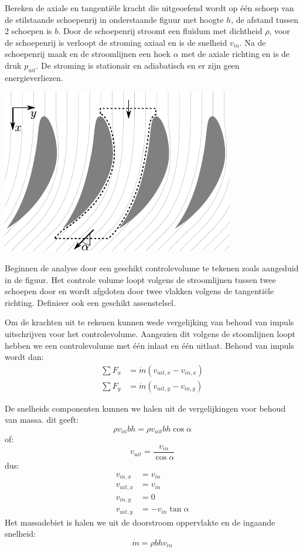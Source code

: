 \begin{voorbeeld}
	Bereken de axiale en tangentiële kracht die uitgeoefend wordt op één schoep van de stilstaande schoepenrij in onderstaande figuur met hoogte $h$, de afstand tussen 2 schoepen is $b$. Door de schoepenrij stroomt een fluïdum met dichtheid $\rho$, voor de schoepenrij is verloopt de stroming axiaal en is de snelheid $v_{in}$. Na de schoepenrij maak en de stroomlijnen een hoek $\alpha$ met de axiale richting en is de druk $p_{uit}$. De stroming is stationair en adiabatisch en er zijn geen energieverliezen.
	\begin{center}
		\includegraphics{fig/controlevolumes/Schoepenrij}
	\end{center}

	Beginnen de analyse door een geschikt controlevolume te tekenen zoals aangeduid in de figuur. Het controle volume loopt volgens de stroomlijnen tussen twee schoepen door en wordt afgsloten door twee vlakken volgens de tangentiële richting. Definieer ook een geschikt assenstelsel.

	Om de krachten uit te rekenen kunnen wede vergelijking van behoud van impuls uitschrijven voor het controlevolume. Aangezien dit volgens de stoomlijnen loopt hebben we een controlevolume met één inlaat en één uitlaat. Behoud van impuls wordt dan:
	\begin{align*}
		\sum F_x &= \dot{m} \left(v_{uit,x} - v_{in,x}\right) \\
		\sum F_y &= \dot{m} \left(v_{uit,y} - v_{in,y}\right)
	\end{align*}

	De snelheids componenten kunnen we halen uit de vergelijkingen voor behoud van massa. dit geeft:
	\begin{equation*}
		\rho v_{in} b h = \rho v_{uit} b h \cos \alpha
	\end{equation*}
	of:
	\begin{equation*}
		v_{uit} = \frac{v_{in}}{\cos \alpha}
	\end{equation*}
	dus:
	\begin{align*}
		v_{in,x}  &= v_{in}\\
		v_{uit,x} &= v_{in}\\
		v_{in,y}  &= 0\\
		v_{uit,y} &= -v_{in}\tan \alpha
	\end{align*}
	Het massadebiet is halen we uit de doorstroom oppervlakte en de ingaande snelheid:
	\begin{equation*}
		\dot{m} = \rho b h v_{in}
	\end{equation*}


\end{voorbeeld}
